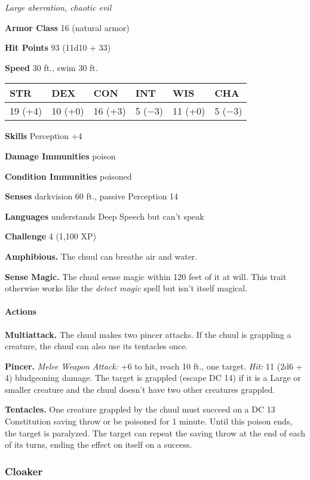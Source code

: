 \documentclass[
]{article}
\begin{document}
\emph{Large aberration, chaotic evil}

\textbf{Armor Class} 16 (natural armor)

\textbf{Hit Points} 93 (11d10 + 33)

\textbf{Speed} 30 ft., swim 30 ft.

\begin{longtable}[]{@{}llllll@{}}
\toprule
STR & DEX & CON & INT & WIS & CHA\tabularnewline
\midrule
\endhead
19 (+4) & 10 (+0) & 16 (+3) & 5 (−3) & 11 (+0) & 5 (−3)\tabularnewline
\bottomrule
\end{longtable}

\textbf{Skills} Perception +4

\textbf{Damage Immunities} poison

\textbf{Condition Immunities} poisoned

\textbf{Senses} darkvision 60 ft., passive Perception 14

\textbf{Languages} understands Deep Speech but can't speak

\textbf{Challenge} 4 (1,100 XP)

\textbf{Amphibious.} The chuul can breathe air and water.

\textbf{Sense Magic.} The chuul sense magic within 120 feet of it at
will. This trait otherwise works like the \emph{detect magic} spell but
isn't itself magical.

\hypertarget{actions-2}{%
\paragraph{Actions}\label{actions-2}}

\textbf{Multiattack.} The chuul makes two pincer attacks. If the chuul
is grappling a creature, the chuul can also use its tentacles once.

\textbf{Pincer.} \emph{Melee Weapon Attack:} +6 to hit, reach 10 ft.,
one target. \emph{Hit:} 11 (2d6 + 4) bludgeoning damage. The target is
grappled (escape DC 14) if it is a Large or smaller creature and the
chuul doesn't have two other creatures grappled.

\textbf{Tentacles.} One creature grappled by the chuul must succeed on a
DC 13 Constitution saving throw or be poisoned for 1 minute. Until this
poison ends, the target is paralyzed. The target can repeat the saving
throw at the end of each of its turns, ending the effect on itself on a
success.

\hypertarget{cloaker}{%
\subsubsection{Cloaker}\label{cloaker}}
\end{document}
